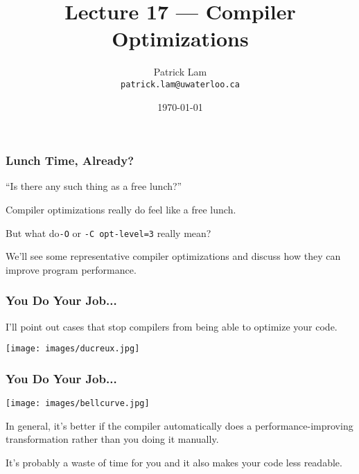 

\title{Lecture 17 --- Compiler Optimizations }

\author{Patrick Lam \\ \small \texttt{patrick.lam@uwaterloo.ca}}
\date{\today}




\begin{frame}
  \titlepage

\end{frame}

\begin{frame}
\frametitle{Lunch Time, Already?}

``Is there any such thing as a free lunch?''

Compiler optimizations really do feel like a free lunch.


But what do{\tt -O} or {\tt -C~opt-level=3} really mean?


We'll see some representative compiler optimizations and discuss how
they can improve program performance. 

\end{frame}

\begin{frame}
\frametitle{You Do Your Job...}

I'll point out cases that stop compilers
from being able to optimize your code. 

\begin{center}
	\texttt{[image: images/ducreux.jpg]}
\end{center}

\end{frame}

\begin{frame}
\frametitle{You Do Your Job...}

\begin{center}
  \texttt{[image: images/bellcurve.jpg]}
\end{center}

In general, it's better if the
compiler automatically does a performance-improving transformation
rather than you doing it manually.

It's probably a waste of time for
you and it also makes your code less readable.

\end{frame}


